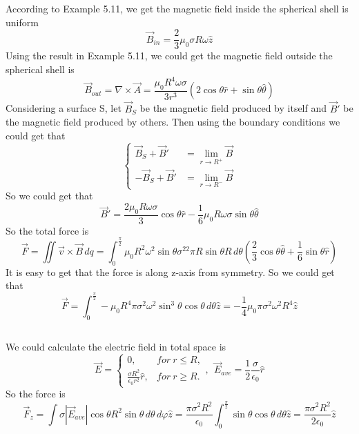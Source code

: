 \documentclass[10.5pt]{article}
\begin{document}
\section{}
\subsection{}
According to Example 5.11, we get the magnetic field inside the spherical shell is uniform $$\vec{B}_{in}=\frac{2}{3}\mu_0\sigma R\omega\hat{z}$$\indent
Using the result in Example 5.11, we could get the magnetic field outside the spherical shell is $$\vec{B}_{out}=\nabla\times\vec{A}=\frac{\mu_0R^4\omega\sigma}{3r^3}\left(2\cos\theta\hat{r}+\sin\theta\hat{\theta}\right)$$\indent
Considering a surface S, let $\vec{B}_S$ be the magnetic field produced by itself and $\vec{B}'$ be the magnetic field produced by others. Then using the boundary conditions we could get that $$\left\{\begin{aligned}
    \vec{B}_S+\vec{B}'&=\lim_{r\to R^+}\vec{B}\\
    -\vec{B}_S+\vec{B}'&=\lim_{r\to R^-}\vec{B}
\end{aligned}\right.$$\indent
So we could get that $$\vec{B}'=\frac{2\mu_0R\omega\sigma}{3}\cos\theta\hat{r}-\frac{1}{6}\mu_0R\omega\sigma\sin\theta\hat{\theta}$$\indent
So the total force is $$\vec{F}=\iint \vec{v}\times\vec{B}\,dq =\int_0^{\frac{\pi}{2}}\mu_0R^2\omega^2\sin\theta\sigma^22\pi R\sin\theta R\,d\theta\left(\frac{2}{3}\cos\theta\hat{\theta}+\frac{1}{6}\sin\theta\hat{r}\right)$$\indent
It is easy to get that the force is along z-axis from symmetry. So we could get that $$\vec{F}=\int_0^{\frac{\pi}{2}}-\mu_0R^4\pi\sigma^2\omega^2\sin^3\theta\cos\theta\,d\theta \hat{z}=-\frac{1}{4}\mu_0\pi\sigma^2\omega^2R^4\hat{z}$$\indent

\subsection{}
We could calculate the electric field in total space is $$\vec{E}=\begin{cases}
    0,&for ~r\leqslant R,\\
    \frac{\sigma R^2}{\epsilon_0r^2}\hat{r},&for ~r\geqslant R.
\end{cases},~~\vec{E}_{ave}=\frac{1}{2}\frac{\sigma}{\epsilon_0}\hat{r}$$\indent
So the force is $$\vec{F}_z=\int\sigma\left\lvert \vec{E}_{ave}\right\rvert \cos\theta R^2\sin\theta\,d\theta\,d\varphi\hat{z}=\frac{\pi\sigma^2R^2}{\epsilon_0}\int_0^{\frac{\pi}{2}}\sin\theta\cos\theta \,d\theta\hat{z}=\frac{\pi\sigma^2R^2}{2\epsilon_0}\hat{z}$$
\end{document}
